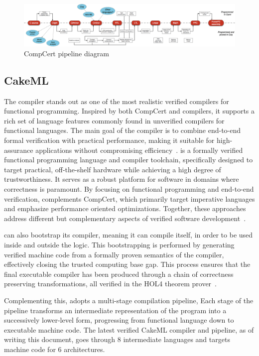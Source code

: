\begin{figure}[H]
    \centering
    \includegraphics[width=\linewidth]{images/compcert_diagram.png}
    \caption{CompCert pipeline diagram~\cite{hal-01643290, CompCertPipeline}}
    \label{fig:CompCertPipeline}
\end{figure}

\subsection{CakeML}
\label{sec:CakeML}

The \cml compiler stands out as one of the most realistic verified compilers for functional programming. Inspired by both CompCert 
and \ocaml compilers, it supports a rich set of language features commonly found in unverified compilers for functional languages. The 
main goal of the \cml compiler is to combine end-to-end formal verification with practical performance, making it suitable 
for high-assurance applications without compromising efficiency~\cite{TanMKFON19}. \cml is a formally verified functional programming 
language and compiler toolchain, specifically designed to target practical, off-the-shelf hardware while achieving a high degree of 
trustworthiness. It serves as a robust platform for software in domains where correctness is paramount. By focusing on functional 
programming and end-to-end verification, \cml complements CompCert, which primarily target imperative languages and emphasize 
performance oriented optimizations. Together, these approaches address different but complementary aspects of verified software 
development~\cite{POPL14}.

\cml can also bootstrap its compiler, meaning it can compile itself, in order to be used inside and outside the logic. This 
bootstrapping is performed by generating verified machine code from a formally proven semantics of the compiler, effectively 
closing the trusted computing base gap. This process ensures that the final executable compiler has been produced through a 
chain of correctness preserving transformations, all verified in the HOL4 theorem prover~\cite{TanMKFON19, POPL14}.

Complementing this, \cml adopts a multi-stage compilation pipeline, Each stage of the pipeline transforms an intermediate representation
of the program into a successively lower-level form, progressing from functional language down to executable machine code. The latest 
verified CakeML compiler and pipeline, as of writing this document, goes through 8 intermediate languages and targets machine code 
for 6 architectures.

